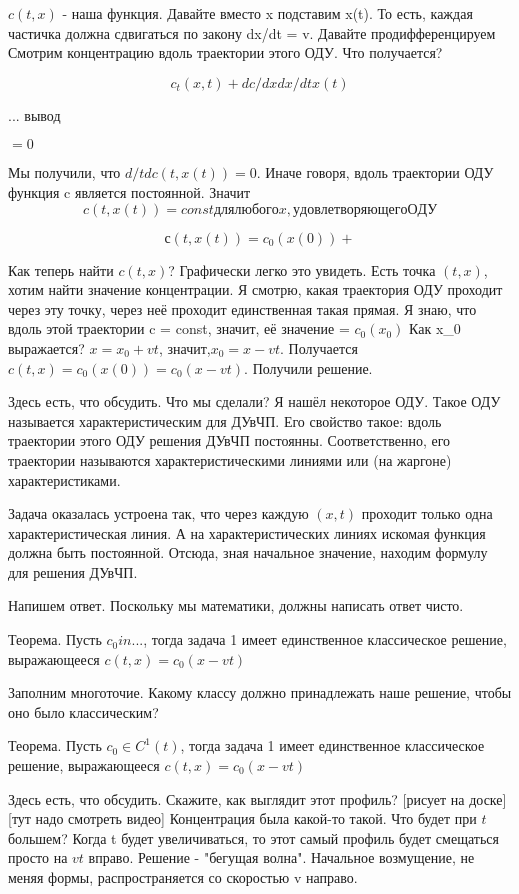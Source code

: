 $c(t,x)$ - наша функция. Давайте вместо x подставим x(t). То есть, каждая частичка должна сдвигаться по закону dx/dt = v. Давайте продифференцируем %
Смотрим концентрацию вдоль траектории этого ОДУ. Что получается?

$$c_t(x,t) + dc/dx dx/dt x(t)$$ %

... вывод

$ = 0$

Мы получили, что $d/td c(t,x(t)) = 0$. Иначе говоря, вдоль траектории ОДУ функция c является постоянной.
Значит
$$c(t,x(t)) = const для любого x, удовлетворяющего ОДУ$$

$$с(t,x(t)) = c_0(x(0)) + $$

Как теперь найти $c(t,x)$? Графически легко это увидеть.
Есть точка $(t,x)$, хотим найти значение концентрации. Я смотрю, какая траектория ОДУ проходит через эту точку, через неё проходит единственная такая прямая. Я знаю, что вдоль этой траектории c = const, значит, её значение = $c_0(x_0)$
Как x_0 выражается? $x = x_0 + vt$, значит,$ x_0 = x - vt$.
Получается $c(t,x) = c_0(x(0)) = c_0(x-vt)$. Получили решение.

Здесь есть, что обсудить. Что мы сделали? Я нашёл некоторое ОДУ. Такое ОДУ называется характеристическим для ДУвЧП. Его свойство такое: вдоль траектории этого ОДУ решения ДУвЧП постоянны. Соответственно, его траектории называются характеристическими линиями или (на жаргоне) характеристиками.

Задача оказалась устроена так, что через каждую $(x,t)$ проходит только одна характеристическая линия. А на характеристических линиях искомая функция должна быть постоянной. Отсюда, зная начальное значение, находим формулу для решения ДУвЧП.

Напишем ответ. Поскольку мы математики, должны написать ответ чисто.

Теорема. Пусть $c_0 in ...$, тогда задача 1 имеет единственное классическое решение, выражающееся $c(t,x) = c_0(x - vt)$
 
Заполним многоточие. Какому классу должно принадлежать наше решение, чтобы оно было классическим? 

Теорема. Пусть $c_0 \in C^1(t)$, тогда задача 1 имеет единственное классическое решение, выражающееся $c(t,x) = c_0(x - vt)$


Здесь есть, что обсудить. Скажите, как выглядит этот профиль? [рисует на доске]
[тут надо смотреть видео]
Концентрация была какой-то такой. Что будет при $t$ большем? Когда t будет увеличиваться, то этот самый профиль будет смещаться просто на $vt$ вправо. Решение - "бегущая волна". Начальное возмущение, не меняя формы, распространяется со скоростью v направо.

